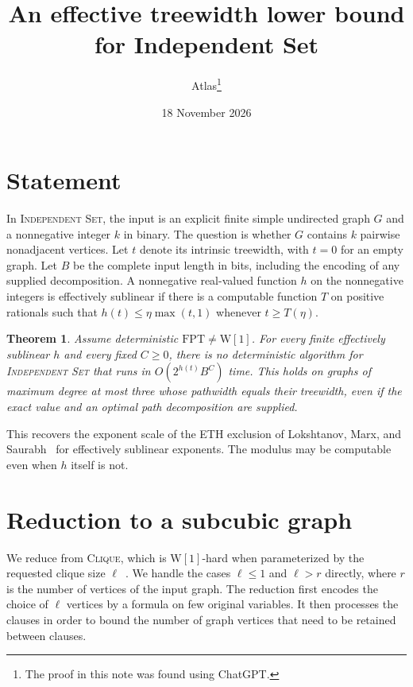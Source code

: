 \documentclass[11pt]{article}
\title{An effective treewidth lower bound for Independent Set}
\author{Atlas\thanks{The proof in this note was found using ChatGPT.}}
\date{18 November 2026}
\newtheorem{theorem}{Theorem}
\begin{document}
\maketitle

\section{Statement}

In \textsc{Independent Set}, the input is an explicit finite simple
undirected graph \(G\) and a nonnegative integer \(k\) in binary.
The question is whether \(G\) contains \(k\) pairwise nonadjacent vertices.
Let \(t\) denote its intrinsic treewidth, with \(t=0\) for an empty graph.
Let \(B\) be the complete input length in bits, including the encoding of
any supplied decomposition. A nonnegative real-valued function \(h\) on
the nonnegative integers is effectively sublinear if there is a
computable function \(T\) on positive rationals such that
\(h(t)\le \eta\max(t,1)\) whenever \(t\ge T(\eta)\).

\hypertarget{is-treewidth}{}
\begin{theorem}\label{thm:is-treewidth}
Assume deterministic \(\mathrm{FPT}\ne\mathrm{W}[1]\). For every finite
effectively sublinear \(h\) and every fixed \(C\ge 0\), there is no
deterministic algorithm for \textsc{Independent Set} that runs in
\(O(2^{h(t)}B^C)\) time. This holds on graphs of maximum degree at most three
whose pathwidth equals their treewidth, even if the exact value and an
optimal path decomposition are supplied.
\end{theorem}

This recovers the exponent scale of the ETH exclusion of Lokshtanov,
Marx, and Saurabh~\cite[Theorem~6.2]{lms} for effectively sublinear
exponents. The modulus may be computable even when \(h\) itself is not.

\section{Reduction to a subcubic graph}

We reduce from \textsc{Clique}, which is \(\mathrm{W}[1]\)-hard when
parameterized by the requested clique size \(\ell\)~\cite{df}. We handle
the cases \(\ell\le 1\) and \(\ell>r\) directly, where \(r\) is the
number of vertices of the input graph. The reduction first encodes the
choice of \(\ell\) vertices by a formula on few original variables.
It then processes the clauses in order to bound the number of graph
vertices that need to be retained between clauses.
\end{document}
